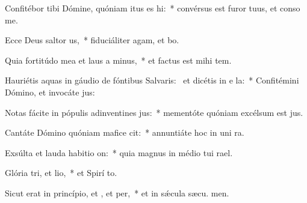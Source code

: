 \item Confitébor tibi Dómine, quóniam itus es hi:~* convérsus est furor tuus, et conso  me.
\item Ecce Deus saltor us,~* fiduciáliter agam, et  bo.
\item Quia fortitúdo mea et laus a minus,~* et factus est mihi  tem.
\item Hauriétis aquas in gáudio de fóntibus Salvaris:~\pscross{} et dicétis in e la:~* Confitémini Dómino, et invocáte  jus:
\item Notas fácite in pópulis adinventines jus:~* mementóte quóniam excélsum est  jus.
\item Cantáte Dómino quóniam mafice cit:~* annuntiáte hoc in uni ra.
\item Exsúlta et lauda habitio on:~* quia magnus in médio tui  rael.
\item Glória tri, et lio,~* et Spirí to.
\item Sicut erat in princípio, et , et per,~* et in sǽcula sæcu. men.
